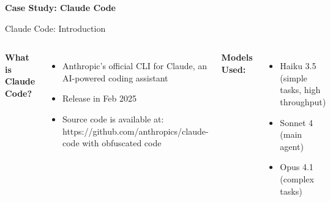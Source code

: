 \documentclass[aspectratio=169]{beamer}
\begin{document}
\begin{frame}
	\begin{center}
		\Large
		\textbf{Case Study: Claude Code}
	\end{center}
\end{frame}

\begin{frame}[fragile]{Claude Code: Introduction}
	\begin{columns}
		\textbf{What is Claude Code?}
		\begin{itemize}
			\item {\color{highlight}Anthropic's official CLI} for Claude, an AI-powered coding assistant
			\item Release in Feb 2025
			\item Source code is available at: https://github.com/anthropics/claude-code with obfuscated code
		\end{itemize}
		
		\textbf{Models Used:}
		\begin{itemize}
			\item Haiku 3.5 (simple tasks, high throughput)
			\item Sonnet 4 (main agent) 
			\item Opus 4.1 (complex tasks)
		\end{itemize}
	\end{columns}
\end{frame}
\end{document}
